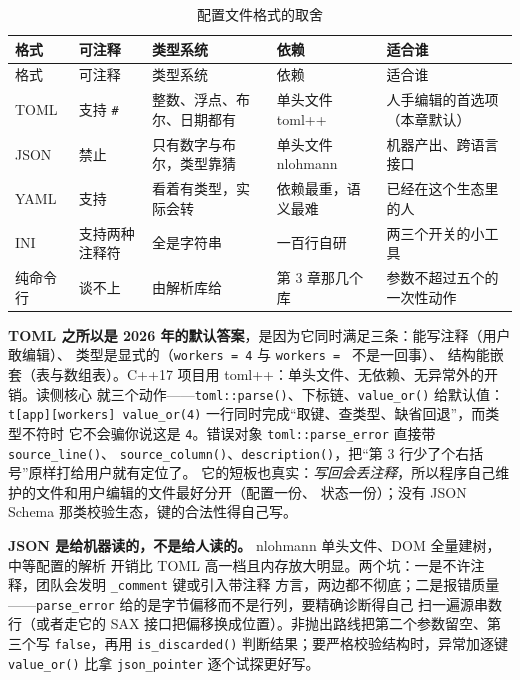 \documentclass[12pt,a4paper,fontset=fandol]{ctexbook}
\newcommand{\cpp}[1]{C++#1}
\newcommand{\Fn}[1]{\texttt{#1()}}
\newcommand{\Tp}[1]{\texttt{#1}}
\newcommand{\Bk}{\allowbreak}
\begin{document}
\begin{longtable}{@{}>{\raggedright\arraybackslash}p{}
                 >{\raggedright\arraybackslash}p{}
                 >{\raggedright\arraybackslash}p{}
                 >{\raggedright\arraybackslash}p{}
                 >{\raggedright\arraybackslash}p{}@{}}
\caption{配置文件格式的取舍} \\
\toprule
格式 & 可注释 & 类型系统 & 依赖 & 适合谁 \\
\midrule
\endfirsthead
\toprule
格式 & 可注释 & 类型系统 & 依赖 & 适合谁 \\
\midrule
\endhead
TOML & 支持 \Tp{\#} & 整数、浮点、布尔、日期都有 & 单头文件 toml++ & 人手编辑的首选项（本章默认） \\
JSON & 禁止 & 只有数字与布尔，类型靠猜 & 单头文件 nlohmann & 机器产出、跨语言接口 \\
YAML & 支持 & 看着有类型，实际会转 & 依赖最重，语义最难 & 已经在这个生态里的人 \\
INI & 支持两种注释符 & 全是字符串 & 一百行自研 & 两三个开关的小工具 \\
纯命令行 & 谈不上 & 由解析库给 & 第 3 章那几个库 & 参数不超过五个的一次性动作 \\
\bottomrule
\end{longtable}

\textbf{TOML 之所以是 2026 年的默认答案}，是因为它同时满足三条：能写注释（用户敢编辑）、
类型是显式的（\Tp{workers = 4} 与 \Tp{workers = \textquotedbl} 不是一回事）、
结构能嵌套（表与数组表）。\cpp{17} 项目用 toml++：单头文件、无依赖、无异常外的开销。读侧核心
就三个动作——\Fn{toml::parse}、下标链、\Fn{value\_or} 给默认值：
\Tp{t[\textquotedbl app\textquotedbl][\textquotedbl workers\textquotedbl]\Bk
value\_or(4)} 一行同时完成``取键、查类型、缺省回退''，而类型不符时
它不会骗你说这是 \Tp{4}。错误对象 \Tp{toml::parse\_error} 直接带 \Fn{source\_line}、
\Fn{source\_column}、\Fn{description}，把``第 3 行少了个右括号''原样打给用户就有定位了。
它的短板也真实：\emph{写回会丢注释}，所以程序自己维护的文件和用户编辑的文件最好分开（配置一份、
状态一份）；没有 JSON Schema 那类校验生态，键的合法性得自己写。

\textbf{JSON 是给机器读的，不是给人读的。} nlohmann 单头文件、DOM 全量建树，中等配置的解析
开销比 TOML 高一档且内存放大明显。两个坑：一是不许注释，团队会发明 \Tp{\_comment} 键或引入带注释
方言，两边都不彻底；二是报错质量——\Tp{parse\_error} 给的是字节偏移而不是行列，要精确诊断得自己
扫一遍源串数行（或者走它的 SAX 接口把偏移换成位置）。非抛出路线把第二个参数留空、第三个写
\Tp{false}，再用 \Fn{is\_discarded} 判断结果；要严格校验结构时，异常加逐键 \Fn{value\_or} 比拿
\Tp{json\_pointer} 逐个试探更好写。
\end{document}
